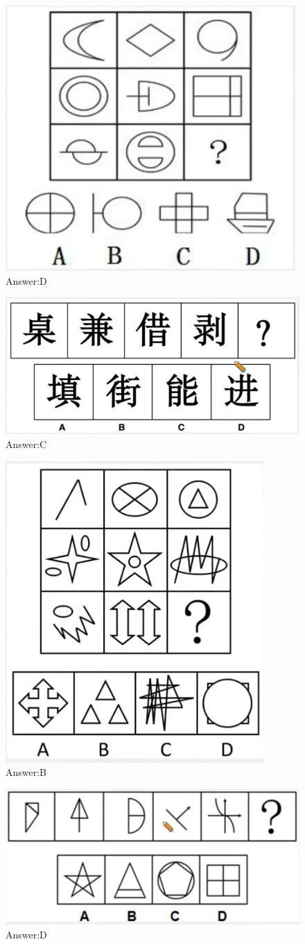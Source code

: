 \documentclass{article}
\numberwithin{equation}{section}						%
\numberwithin{figure}{section}							%
\begin{document}
\begin{sloppypar}
\begin{figure}[H]
     \centering
     \includegraphics[width=0.45\linewidth]{65.png}
		\caption{Answer:D}
\end{figure}


\begin{figure}[H]
     \centering
     \includegraphics[width=0.6\linewidth]{66.png}
		\caption{Answer:C}
\end{figure}


\begin{figure}[H]
     \centering
     \includegraphics[width=0.45\linewidth]{67.png}
		\caption{Answer:B}
\end{figure}


\begin{figure}[H]
     \centering
     \includegraphics[width=0.6\linewidth]{68.png}
		\caption{Answer:D}
\end{figure}



\end{sloppypar}
\end{document}

